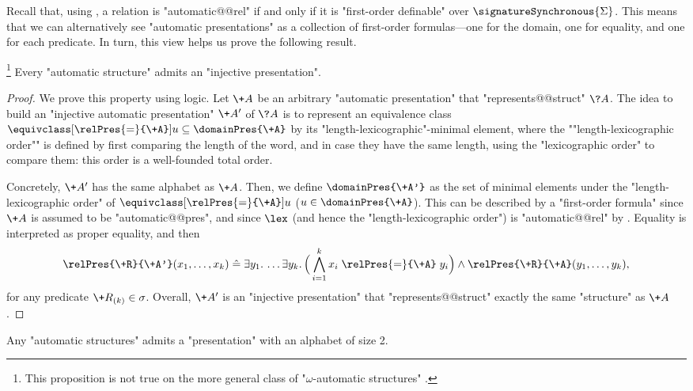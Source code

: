 Recall that, using , a relation is "automatic@@rel" 
if and only if it is "first-order definable" over $\signatureSynchronous{\Sigma}$.
This means that we can alternatively see "automatic presentations" as a
collection of first-order formulas---one for the domain, one for equality, and
one for each predicate. In turn, this view helps us prove the following result.


\begin{proposition}
	\!\footnote{\AP\label{footnote:omega-not-injective}%
	This proposition is not true on the more general class
	of "$\omega$-automatic structures"
	\cite[Theorem~6.6]{HjorthKhoussainovMontalbánNiesAutomaticStructures}.}
	\AP\label{prop:making-presentations-injective}
	Every "automatic structure" admits an "injective presentation".
\end{proposition}

\begin{proof}
	We prove this property using logic. Let $\+A$ be an arbitrary "automatic presentation"
	that "represents@@struct" $\?A$. The idea to build an "injective automatic presentation" $\+A'$
	of $\?A$ is to represent an equivalence class $\equivclass[\relPres{=}{\+A}]{u} \subseteq
	\domainPres{\+A}$ by its "length-lexicographic"-minimal element,
	where the \AP""length-lexicographic order"" is defined
	by first comparing the length of the word, and in case they have the same length,
	using the "lexicographic order" to compare them: this order is a well-founded total order.

	Concretely, $\+A'$ has the same alphabet as $\+A$.
	Then, we define $\domainPres{\+A'}$ as the set of minimal elements
	under the "length-lexicographic order" of
	$\equivclass[\relPres{=}{\+A}]{u}$ ($u \in \domainPres{\+A}$).
	This can be described by a "first-order formula" since $\+A$ is assumed to be "automatic@@pres",
	and since $\lex$ (and hence the "length-lexicographic order") is "automatic@@rel" by .
	Equality is interpreted as proper equality,
	and then
	\[
		\relPres{\+R}{\+A'}(x_1,\dotsc, x_k) \defeq
		\exists y_1.\,\dotsc \exists y_k.\,
		\Big( \bigwedge_{i=1}^k x_i \mathrel{\relPres{=}{\+A}} y_i \Big)
		\land \relPres{\+R}{\+A}(y_1,\dotsc, y_k),
	\]
	for any predicate $\+R_{(k)} \in \sigma$.
	Overall, $\+A'$ is an "injective presentation" that "represents@@struct" 
	exactly the same "structure" as $\+A$.
\end{proof}

\begin{proposition}
	\AP\label{prop:making-presentations-binary}
	Any "automatic structures" admits a "presentation" with an alphabet of size 2.
\end{proposition}

